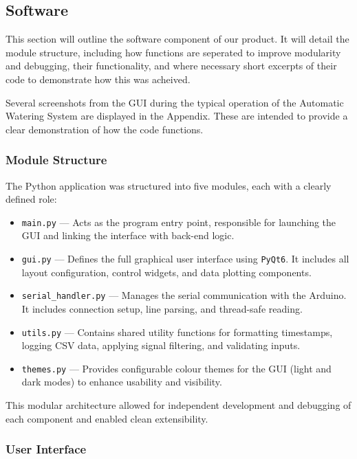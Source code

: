 \documentclass[a4paper,11pt]{article}
\begin{document}
\subsection{Software}
\label{sec:software}

This section will outline the software component of our product.
It will detail the module structure,
including how functions are seperated to improve modularity and debugging,
their functionality,
and where necessary short excerpts of their code to demonstrate how this was acheived.

Several screenshots from the GUI during the typical operation
of the Automatic Watering System are displayed in the Appendix.
These are intended to provide a clear demonstration of how the code functions.

\subsubsection{Module Structure}
\label{subsec:software_modules}

The Python application was structured into five modules, each with a clearly defined role:

\begin{itemize}
    \item \texttt{main.py} --- Acts as the program entry point, 
    responsible for launching the GUI and linking the interface with back-end logic.
    \item \texttt{gui.py} --- Defines the full graphical user interface using \texttt{PyQt6}. 
    It includes all layout configuration, control widgets, and data plotting components.
    \item \texttt{serial\_handler.py} --- Manages the serial communication with the Arduino. 
    It includes connection setup, line parsing, and thread-safe reading.
    \item \texttt{utils.py} --- Contains shared utility functions for formatting timestamps, 
    logging CSV data, applying signal filtering, and validating inputs.
    \item \texttt{themes.py} --- Provides configurable colour themes for the GUI 
    (light and dark modes) to enhance usability and visibility.
\end{itemize}

This modular architecture allowed for independent development and 
debugging of each component and enabled clean extensibility.

\subsubsection{User Interface}
\label{subsec:software_ui}
\end{document}
